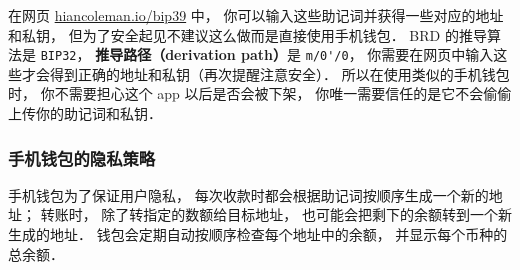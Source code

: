 在网页 \href{https://iancoleman.io/bip39/}{hiancoleman.io/bip39} 中， 你可以输入这些助记词并获得一些对应的地址和私钥， 但为了安全起见不建议这么做而是直接使用手机钱包． BRD 的推导算法是 \verb|BIP32|， \textbf{推导路径（derivation path）}是 \verb|m/0'/0|， 你需要在网页中输入这些才会得到正确的地址和私钥（再次提醒注意安全）． 所以在使用类似的手机钱包时， 你不需要担心这个 app 以后是否会被下架， 你唯一需要信任的是它不会偷偷上传你的助记词和私钥．

\subsubsection{手机钱包的隐私策略}
手机钱包为了保证用户隐私， 每次收款时都会根据助记词按顺序生成一个新的地址； 转账时， 除了转指定的数额给目标地址， 也可能会把剩下的余额转到一个新生成的地址． 钱包会定期自动按顺序检查每个地址中的余额， 并显示每个币种的总余额．

